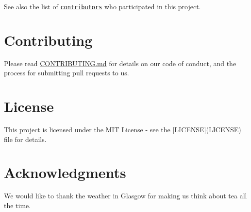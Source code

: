 See also the list of \href{https://github.com/GlasgowTeam3RTEP/ExcellenTea/contributors}{\tt contributors} who participated in this project.

\section*{Contributing}

Please read \mbox{\hyperlink{md__c_o_n_t_r_i_b_u_t_i_n_g}{C\+O\+N\+T\+R\+I\+B\+U\+T\+I\+NG.md}} for details on our code of conduct, and the process for submitting pull requests to us.

\section*{License}

This project is licensed under the M\+IT License -\/ see the \mbox{[}L\+I\+C\+E\+N\+SE\mbox{]}(L\+I\+C\+E\+N\+SE) file for details.

\section*{Acknowledgments}

We would like to thank the weather in Glasgow for making us think about tea all the time. 